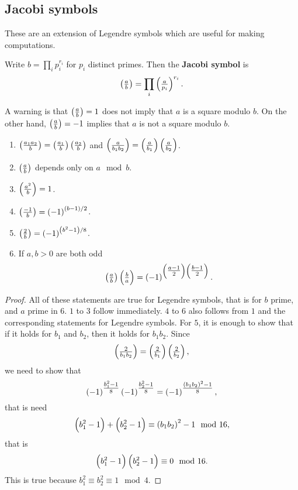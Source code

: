 \pagebreak

\subsection{Jacobi symbols}

These are an extension of Legendre symbols which are useful for making computations.

\begin{definition}
Write $ b = \prod_i p_i^{r_i} $ for $ p_i $ distinct primes. Then the \textbf{Jacobi symbol} is
$$ \jacobi{a}{b} = \prod_i \jacobi{a}{p_i}^{r_i}. $$
\end{definition}

A warning is that $ \jacobi{a}{b} = 1 $ does not imply that $ a $ is a square modulo $ b $. On the other hand, $ \jacobi{a}{b} = -1 $ implies that $ a $ is not a square modulo $ b $.


\begin{lemma}
\hfill
\begin{enumerate}
\item $ \jacobi{a_1a_2}{b} = \jacobi{a_1}{b}\jacobi{a_2}{b} $ and $ \jacobi{a}{b_1b_2} = \jacobi{a}{b_1}\jacobi{a}{b_2} $.
\item $ \jacobi{a}{b} $ depends only on $ a \mod b $.
\item $ \jacobi{a^2}{b} = 1 $.
\item $ \jacobi{-1}{b} = \br{-1}^{\br{b - 1} / 2} $.
\item $ \jacobi{2}{b} = \br{-1}^{\br{b^2 - 1} / 8} $.
\item If $ a, b > 0 $ are both odd
$$ \jacobi{a}{b}\jacobi{b}{a} = \br{-1}^{\br{\tfrac{a - 1}{2}}\br{\tfrac{b - 1}{2}}}. $$
\end{enumerate}
\end{lemma}

\begin{proof}
All of these statements are true for Legendre symbols, that is for $ b $ prime, and $ a $ prime in $ 6 $. $ 1 $ to $ 3 $ follow immediately. $ 4 $ to $ 6 $ also follows from $ 1 $ and the corresponding statements for Legendre symbols. For $ 5 $, it is enough to show that if it holds for $ b_1 $ and $ b_2 $, then it holds for $ b_1b_2 $. Since
$$ \jacobi{2}{b_1b_2} = \jacobi{2}{b_1}\jacobi{2}{b_2}, $$
we need to show that
$$ \br{-1}^{\tfrac{b_1^2 - 1}{8}}\br{-1}^{\tfrac{b_2^2 - 1}{8}} = \br{-1}^{\tfrac{\br{b_1b_2}^2 - 1}{8}}, $$
that is need
$$ \br{b_1^2 - 1} + \br{b_2^2 - 1} \equiv \br{b_1b_2}^2 - 1 \mod 16, $$
that is
$$ \br{b_1^2 - 1}\br{b_2^2 - 1} \equiv 0 \mod 16. $$
This is true because $ b_1^2 \equiv b_2^2 \equiv 1 \mod 4 $.
\end{proof}

